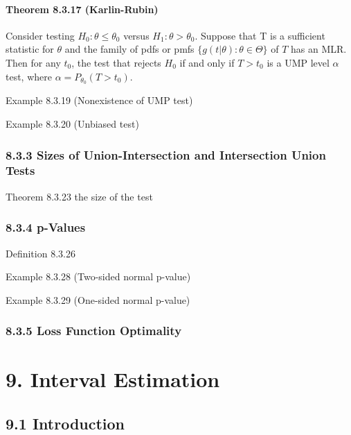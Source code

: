 \documentclass[6pt,Portrait]{article}
\let\oldparagraph\paragraph
\renewcommand{\paragraph}[1]{\oldparagraph{#1}\mbox{}}
\begin{document}
\hypertarget{Kar-Rub}{%
\paragraph{\texorpdfstring{\textbf{Theorem 8.3.17
(Karlin-Rubin)}}{Theorem 8.3.17 (Karlin-Rubin)}}\label{Kar-Rub}}

Consider testing \(H_0:\theta\le\theta_0\) versus
\(H_1:\theta>\theta_0\). Suppose that T is a sufficient statistic for
\(\theta\) and the family of pdfs or pmfs
\(\{g(t|\theta):\theta\in\Theta\}\) of \(T\) has an MLR. Then for any
\(t_0\), the test that rejects \(H_0\) if and only if \(T>t_0\) is a UMP
level \(\alpha\) test, where \(\alpha= P_{\theta_0}(T>t_0)\).

Example 8.3.19 (Nonexistence of UMP test)

Example 8.3.20 (Unbiased test)

\hypertarget{sizes-of-union-intersection-and-intersection-union-tests}{%
\subsubsection{8.3.3 Sizes of Union-Intersection and Intersection Union
Tests}\label{sizes-of-union-intersection-and-intersection-union-tests}}

Theorem 8.3.23 the size of the test

\hypertarget{p-values}{%
\subsubsection{8.3.4 p-Values}\label{p-values}}

Definition 8.3.26

Example 8.3.28 (Two-sided normal p-value)

Example 8.3.29 (One-sided normal p-value)

\hypertarget{loss-function-optimality-1}{%
\subsubsection{8.3.5 Loss Function
Optimality}\label{loss-function-optimality-1}}

\hypertarget{interval-estimation}{%
\section{9. Interval Estimation}\label{interval-estimation}}

\hypertarget{introduction-2}{%
\subsection{9.1 Introduction}\label{introduction-2}}
\end{document}
